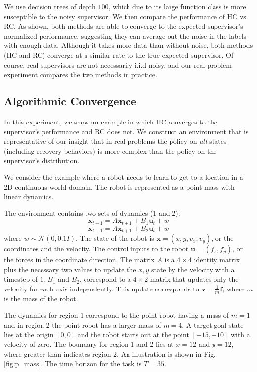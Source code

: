 \documentclass[10pt, conference]{ieeeconf}      %
\newcommand{\bu}{\mathbf{u}}
\newcommand{\bx}{\mathbf{x}}
\begin{document}
We use decision trees of depth $100$, which due to its large function class is more susceptible to the noisy supervisor. We then compare the performance of HC vs. RC. As shown, both methods are able to converge to the expected supervisor's normalized performance, suggesting they can average out the noise in the labels with enough data. Although it takes more data than without noise, both methods (HC and RC) converge at a similar rate to the true expected supervisor. Of course, real supervisors are not necessarily i.i.d noisy, and our real-problem experiment compares the two methods in practice.

\subsection{Algorithmic Convergence}
In this experiment, we show an example in which HC converges to the supervisor's performance and RC does not. We construct an environment that is representative of our insight that in real problems the policy on \emph{all} states (including recovery behaviors) is more complex than the policy on the supervisor's distribution.

We consider the example where a robot needs to learn to get to a location in a 2D continuous world domain. The robot is represented as a point mass with linear dynamics. 

The environment contains two sets of dynamics (1 and 2): 
$$\bx_{t+1} = A\bx_{t+1}+B_1\bu_t+w$$
$$\bx_{t+1} = A\bx_{t+1}+B_2\bu_t + w$$
where $w\sim \mathcal{N}(0,0.1 I)$. The state of the robot is $\bx = (x,y,v_x,v_y)$, or the coordinates and the velocity. The control inputs to the robot $\bu = (f_x,f_y)$, or the forces in the coordinate direction. The matrix $A$ is a $4\times4$ identity matrix plus the necessary two values to update the $x,y$ state by the velocity with a timestep of $1$. $B_1$ and $B_2$, correspond to a $4\times 2$ matrix that updates only the velocity for each axis independently. This update corresponds to $\mathbf{v} = \frac{1}{m} \mathbf{f}$, where $m$ is the mass of the robot.


The dynamics for region 1 correspond to the point robot having a mass of $m=1$ and in region 2 the point robot has a larger mass of $m=4$. A target goal state lies at the origin $[0,0]$ and the robot starts out at the point $[-15,-10]$ with a velocity of zero. The boundary for region 1 and 2 lies at $x=12$ and $y=12$, where greater than indicates region 2. An illustration is shown in Fig. \ref{fig:p_mass}. The time horizon for the task is $T=35$. 
\end{document}
